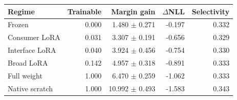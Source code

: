\begin{tabular}{lrrrr}
\toprule
Regime & Trainable & Margin gain & $\Delta$NLL & Selectivity \\
\midrule
Frozen & 0.000 & 1.480 $\pm$ 0.271 & -0.197 & 0.332 \\
Consumer LoRA & 0.031 & 3.307 $\pm$ 0.191 & -0.656 & 0.329 \\
Interface LoRA & 0.040 & 3.924 $\pm$ 0.456 & -0.754 & 0.330 \\
Broad LoRA & 0.142 & 4.957 $\pm$ 0.318 & -0.891 & 0.333 \\
Full weight & 1.000 & 6.470 $\pm$ 0.259 & -1.062 & 0.333 \\
Native scratch & 1.000 & 10.992 $\pm$ 0.493 & -1.583 & 0.343 \\
\bottomrule
\end{tabular}
